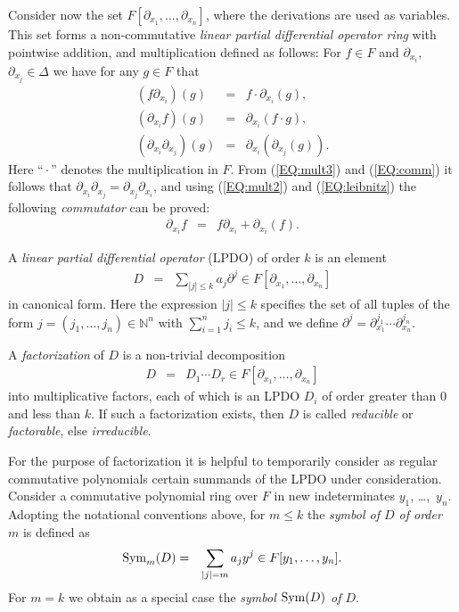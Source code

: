 Consider now the set $F[\partial_{x_1},\dots,\partial_{x_n}]$, where
the derivations are used as variables. This set forms a
non-commutative \emph{linear partial differential operator ring} with
pointwise addition, and multiplication defined as follows: For $f\in
F$ and $\partial_{x_i}$, $\partial_{x_j} \in \Delta$ we have for any
$g\in F$ that
\begin{eqnarray}
    (f \partial_{x_i})(g) &=& f \cdot \partial_{x_i}(g),\nonumber\\
    (\partial_{x_i} f)(g) &=& \partial_{x_i}(f \cdot g),\label{EQ:mult2}\\
    (\partial_{x_i} \partial_{x_j})(g) &=& \partial_{x_i}(\partial_{x_j}(g)).\label{EQ:mult3}
\end{eqnarray}
Here ``${}\cdot{}$'' denotes the multiplication in $F$. From
(\ref{EQ:mult3}) and (\ref{EQ:comm}) it follows that
$\partial_{x_i} \partial_{x_j}=\partial_{x_j} \partial_{x_i}$, and
using (\ref{EQ:mult2}) and (\ref{EQ:leibnitz}) the following
\emph{commutator} can be proved:
\begin{eqnarray*}
  \partial_{x_i} f &=& f \partial_{x_i} + \partial_{x_i}(f).
\end{eqnarray*}

A \emph{linear partial differential operator} (LPDO) of order $k$ is
an element
\begin{eqnarray*}
  D &=& \sum_{|j| \leq k} a_j \partial^j\in
  F[\partial_{x_1},\dots,\partial_{x_n}]
\end{eqnarray*}
in canonical form. Here the expression $|j| \leq k$ specifies the set
of all tuples of the form $j = (j_1,\dots,j_n) \in \mathbb{N}^n$ with
$\sum_{i=1}^n j_i \leq k$, and we define $\partial^j
= \partial_{x_1}^{j_1} \cdots \partial_{x_n}^{j_n}$.

A \emph{factorization} of $D$ is a non-trivial decomposition
\begin{eqnarray*}
D &=& D_1 \cdots D_r\in F[\partial_{x_1},\dots,\partial_{x_n}]
\end{eqnarray*}
into multiplicative factors, each of which is an LPDO $D_i$ of order
greater than $0$ and less than $k$. If such a factorization exists,
then $D$ is called \emph{reducible} or \emph{factorable}, else
\emph{irreducible}.

For the purpose of factorization it is helpful to temporarily consider
as regular commutative polynomials certain summands of the LPDO under
consideration. Consider a commutative polynomial ring over $F$ in new
indeterminates $y_1$, \dots,~$y_n$. Adopting the notational
conventions above, for $m\leq k$ the \emph{symbol of $D$ of order $m$}
is defined as
\begin{eqnarray*}
  \operatorname{Sym}_m(D) &=& \sum_{|j| = m} a_j y^j\in F[y_1,\dots,y_n].
\end{eqnarray*}
For $m=k$ we obtain as a special case the \emph{symbol $\operatorname{Sym}(D)$ of
  $D$}.


